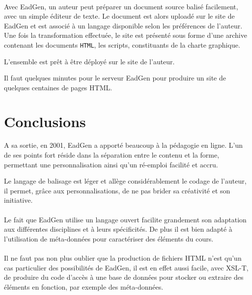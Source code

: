 \paragraph{}Avec EadGen, un auteur peut préparer un document source balisé facilement, avec un simple éditeur de texte. Le document est alors uploadé sur le site de EadGen et est associé à un langage disponible selon les préférences de l'auteur. Une fois la transformation effectuée, le site est présenté sous forme d'une archive contenant les documents \texttt{HTML}, les scripts, constituants de la charte graphique.

L'ensemble est prêt à être déployé sur le site de l'auteur.

Il faut quelques minutes pour le serveur EadGen pour produire un site de quelques centaines de pages HTML.





\section{Conclusions}


\paragraph{}A sa sortie, en 2001, EadGen a apporté beaucoup à la pédagogie en ligne. L'un de ses points fort réside dans la séparation entre le contenu et la forme, permettant une personnalisation ainsi qu'un ré-emploi facilité et accru.


Le langage de balisage est léger et allège considérablement le codage de l'auteur, il permet, grâce aux personnalisations, de ne pas brider sa créativité et son initiative.


\paragraph{}Le fait que EadGen utilise un langage ouvert facilite grandement son adaptation aux différentes disciplines et à leurs spécificités. De plus il est bien adapté à l'utilisation de méta-données pour caractériser des éléments du cours.


\paragraph{}Il ne faut pas non plus oublier que la production de fichiers HTML n'est qu'un cas particulier des possibilités de EadGen, il est en effet aussi facile, avec XSL-T, de produire du code d'accès à une base de données pour stocker ou extraire des éléments en fonction, par exemple des méta-données.
